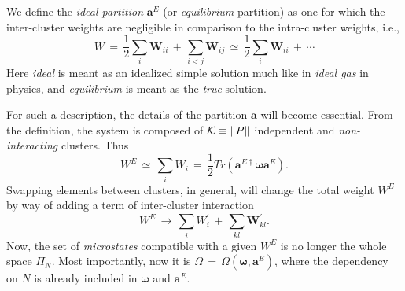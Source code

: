 \documentclass[twocolumn,aps,sort,nofootinbib]{revtex4}
\begin{document}
We define the {\sl ideal partition} $\boldsymbol{a}^E$ (or {\sl equilibrium} partition) 
as one for which
the inter-cluster weights are negligible in comparison to the intra-cluster weights, i.e.,
\begin{equation}
W\,=\,\frac{1}{2}\sum_i \boldsymbol{W}_{ii} \,+\, \sum_{i<j} \boldsymbol{W}_{ij}\,\simeq\,
\frac{1}{2}\sum_i \boldsymbol{W}_{ii}\,+\,\cdots
\label{IdealPartition}
\end{equation}
Here {\sl ideal} is meant as 
an idealized simple solution much like in {\sl ideal gas} in physics,
and {\sl equilibrium} is meant as the {\sl true} solution. 


For such a description, the details of the partition $\boldsymbol{a}$
will become essential. From the definition, the system is composed of ${\cal K}\equiv\|P\|$
independent and {\sl non-interacting} clusters. Thus
\begin{equation}
W^E\,\simeq\,\sum_i W_i\,=\,\frac{1}{2}Tr(\boldsymbol{a}^{E\dagger}\boldsymbol{\omega}\boldsymbol{a}^E).
\label{TotalEnergyIdealPartition}
\end{equation}
Swapping elements between clusters, in general, will change the total weight $W^E$ by way
of adding a term of inter-cluster interaction
\begin{equation}
W^E\,\rightarrow\,\sum_i W^\prime_i\,+\,\sum_{kl}\boldsymbol{W}^{\prime}_{kl}.
\end{equation}
Now, the set of {\sl microstates} compatible with a given $W^E$ is 
no longer the whole space $\Pi_N$. 
Most importantly, now it is $\Omega\,=\,\Omega (\boldsymbol{\omega},\boldsymbol{a}^E)$,
where the dependency on $N$ is already included in $\boldsymbol{\omega}$ and $\boldsymbol{a}^E$.
\end{document}
